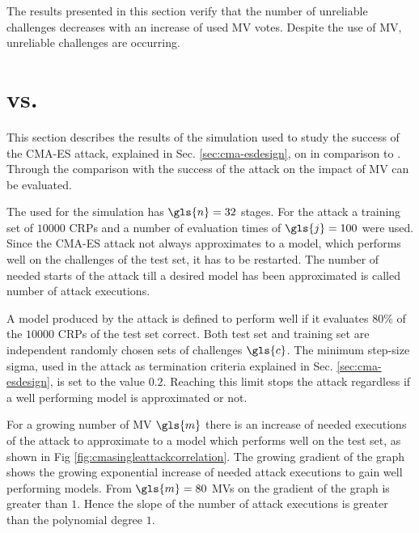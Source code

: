 The results presented in this section verify that the number of unreliable challenges decreases with an increase of used \ac{MV} votes.
Despite the use of \ac{MV}, unreliable challenges are occurring.


\section{\apufs vs. \mpufs}
\label{sec:arbitervsmajorityarbiter}

This section describes the results of the simulation used to study the success of the \ac{CMA-ES} attack, explained in Sec. \ref{sec:cma-esdesign}, on \mpufs in comparison to \apufs.
Through the comparison with the success of the attack on \apuf the impact of \ac{MV} can be evaluated.

The \apuf used for the simulation has $\gls{n} = 32$ stages.
For the attack a training set of $10000$ \acp{CRP} and a number of evaluation times of $\gls{j} = 100$ were used.
Since the \ac{CMA-ES} attack not always approximates to a model, which performs well on the challenges of the test set, it has to be restarted.
The number of needed starts of the attack till a desired model has been approximated is called number of attack executions.

A model produced by the attack is defined to perform well if it evaluates $80 \%$ of the $10000$ \acp{CRP} of the test set correct.
Both test set and training set are independent randomly chosen sets of challenges $\gls{c}$.
The minimum step-size sigma, used in the attack as termination criteria explained in Sec. \ref{sec:cma-esdesign}, is set to the value $0.2$.
Reaching this limit stops the attack regardless if a well performing model is approximated or not.

For a growing number of \ac{MV} $\gls{m}$ there is an increase of needed executions of the attack to approximate to a model which performs well on the test set, as shown in Fig \ref{fig:cmasingleattackcorrelation}.
The growing gradient of the graph shows the growing exponential increase of needed attack executions to gain well performing models.
From $\gls{m} = 80$ \acp{MV} on the gradient of the graph is greater than $1$.
Hence the slope of the number of attack executions is greater than the polynomial degree $1$.

